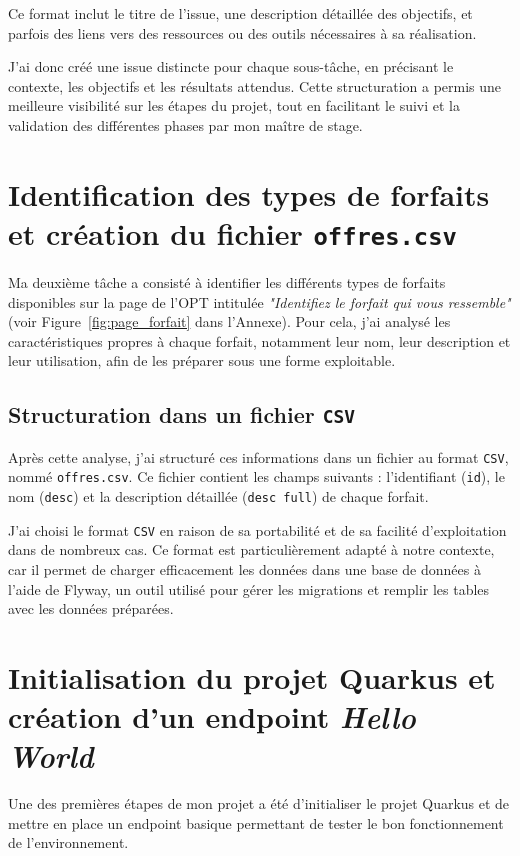 \documentclass{article}
\begin{document}
	Ce format inclut le titre de l’issue, une description détaillée des objectifs, et parfois des liens vers des ressources ou des outils nécessaires à sa réalisation.
	
	J’ai donc créé une issue distincte pour chaque sous-tâche, en précisant le contexte, les objectifs et les résultats attendus. Cette structuration a permis une meilleure visibilité sur les étapes du projet, tout en facilitant le suivi et la validation des différentes phases par mon maître de stage.
	\newpage
	\section{Identification des types de forfaits et création du fichier \texttt{offres.csv}}
	
	Ma deuxième tâche a consisté à identifier les différents types de forfaits disponibles sur la page de l’OPT intitulée \textit{"Identifiez le forfait qui vous ressemble"} (voir Figure~\ref{fig:page_forfait} dans l'Annexe). Pour cela, j’ai analysé les caractéristiques propres à chaque forfait, notamment leur nom, leur description et leur utilisation, afin de les préparer sous une forme exploitable.
	
	\subsection*{Structuration dans un fichier \texttt{CSV}}
	Après cette analyse, j’ai structuré ces informations dans un fichier au format \texttt{CSV}, nommé \texttt{offres.csv}. Ce fichier contient les champs suivants : l’identifiant (\texttt{id}), le nom (\texttt{desc}) et la description détaillée (\texttt{desc full}) de chaque forfait.
	
	J’ai choisi le format \texttt{CSV} en raison de sa portabilité et de sa facilité d’exploitation dans de nombreux cas. Ce format est particulièrement adapté à notre contexte, car il permet de charger efficacement les données dans une base de données à l’aide de Flyway, un outil utilisé pour gérer les migrations et remplir les tables avec les données préparées.
	
	\section{Initialisation du projet Quarkus et création d’un endpoint \textit{Hello World}}
	
	Une des premières étapes de mon projet a été d’initialiser le projet Quarkus et de mettre en place un endpoint basique permettant de tester le bon fonctionnement de l’environnement.
	
\end{document}
